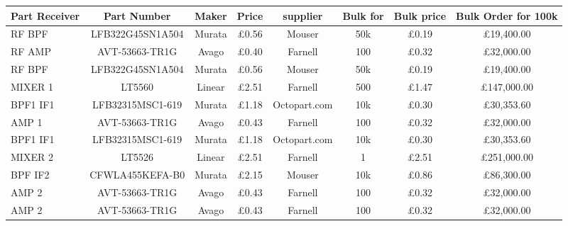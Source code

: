


\begin{sidewaystable} %
\centering %
\begin{tabular}{l c c c c c c c} %

Part Receiver & Part Number & Maker & Price & supplier & Bulk for & Bulk price & Bulk Order for 100k\\ %
\midrule %

RF BPF& LFB322G45SN1A504& Murata& \pounds0.56 &Mouser &50k& \pounds0.19 &\pounds19,400.00\\
RF AMP & AVT-53663-TR1G &Avago &\pounds0.40 &Farnell &100 & \pounds 0.32& \pounds32,000.00\\
RF BPF& LFB322G45SN1A504& Murata& \pounds0.56 &Mouser &50k& \pounds0.19 &\pounds19,400.00\\
MIXER 1 & LT5560 &Linear 
&\pounds2.51 &Farnell &500 &\pounds1.47 &\pounds147,000.00\\
BPF1 IF1&  LFB32315MSC1-619& Murata& \pounds1.18& Octopart.com &10k& \pounds0.30& \pounds30,353.60\\
AMP 1 & AVT-53663-TR1G& Avago &\pounds0.43 &Farnell &100 &\pounds0.32 &\pounds32,000.00\\
BPF1 IF1& LFB32315MSC1-619& Murata& \pounds1.18 & Octopart.com &10k& \pounds0.30& \pounds30,353.60\\
MIXER 2& LT5526& Linear &\pounds2.51 &Farnell& 1 &\pounds2.51 &\pounds251,000.00\\
BPF IF2& CFWLA455KEFA-B0 &Murata &\pounds2.15 &Mouser &10k& \pounds0.86 &\pounds86,300.00\\
AMP 2& AVT-53663-TR1G &Avago& \pounds0.43& Farnell& 100 &\pounds0.32 &\pounds32,000.00\\

AMP 2& AVT-53663-TR1G& Avago &\pounds0.43& Farnell &100 &\pounds0.32 &\pounds32,000.00\\


\end{tabular}
\end{sidewaystable}
